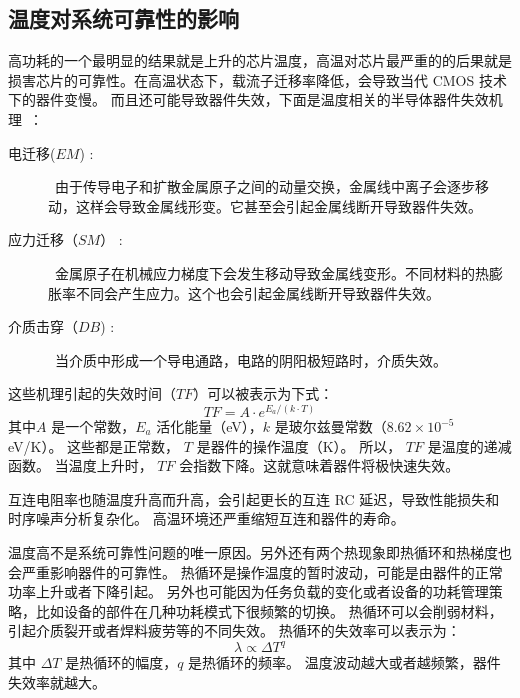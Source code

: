 \subsection{温度对系统可靠性的影响}\label{sec:reliability}
高功耗的一个最明显的结果就是上升的芯片温度，高温对芯片最严重的的后果就是损害芯片的可靠性。在高温状态下，载流子迁移率降低，会导致当代 CMOS 技术下的器件变慢。
而且还可能导致器件失效，下面是温度相关的半导体器件失效机理~\cite{jedec2003failure}：
\begin{description}
\item[电迁移($EM$) :] ~由于传导电子和扩散金属原子之间的动量交换，金属线中离子会逐步移动，这样会导致金属线形变。它甚至会引起金属线断开导致器件失效。
\item[应力迁移（$SM$） :] ~金属原子在机械应力梯度下会发生移动导致金属线变形。不同材料的热膨胀率不同会产生应力。这个也会引起金属线断开导致器件失效。
\item[介质击穿（$DB$) :] ~当介质中形成一个导电通路，电路的阴阳极短路时，介质失效。
\end{description}

这些机理引起的失效时间（$TF$）可以被表示为下式：
\begin{equation}
TF = A \cdot e^{E_a/(k \cdot T)}
\end{equation}
其中$A$ 是一个常数，$E_a$ 活化能量（eV），$k$ 是玻尔兹曼常数（$8.62 \times 10^{-5}$ eV/K）。
这些都是正常数， $T$ 是器件的操作温度（K）。
所以， $TF$ 是温度的递减函数。
当温度上升时， $TF$ 会指数下降。这就意味着器件将极快速失效。

互连电阻率也随温度升高而升高，会引起更长的互连 RC 延迟，导致性能损失和时序噪声分析复杂化。
高温环境还严重缩短互连和器件的寿命。

温度高不是系统可靠性问题的唯一原因。另外还有两个热现象即热循环和热梯度也会严重影响器件的可靠性。
热循环是操作温度的暂时波动，可能是由器件的正常功率上升或者下降引起。
另外也可能因为任务负载的变化或者设备的功耗管理策略，比如设备的部件在几种功耗模式下很频繁的切换。
热循环可以会削弱材料，引起介质裂开或者焊料疲劳等的不同失效。
热循环的失效率可以表示为：
\begin{equation}
\lambda \propto \Delta T^q
\end{equation}
其中 $\Delta T$ 是热循环的幅度，$q$ 是热循环的频率。
温度波动越大或者越频繁，器件失效率就越大。

